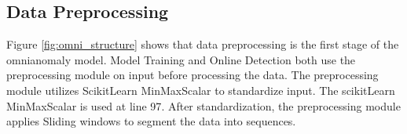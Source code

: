 \subsection{Data Preprocessing}
Figure \ref{fig:omni_structure} shows that data preprocessing is the first stage of the \gls{omnianomaly} model. Model Training and Online Detection both use the preprocessing module on input before processing the data. The preprocessing module utilizes ScikitLearn MinMaxScalar to standardize input. The scikitLearn MinMaxScalar is used at line 97\cite{PreProcessingSchilearn}. After standardization, the preprocessing module applies Sliding windows to segment the data into sequences.\cite{kdd}